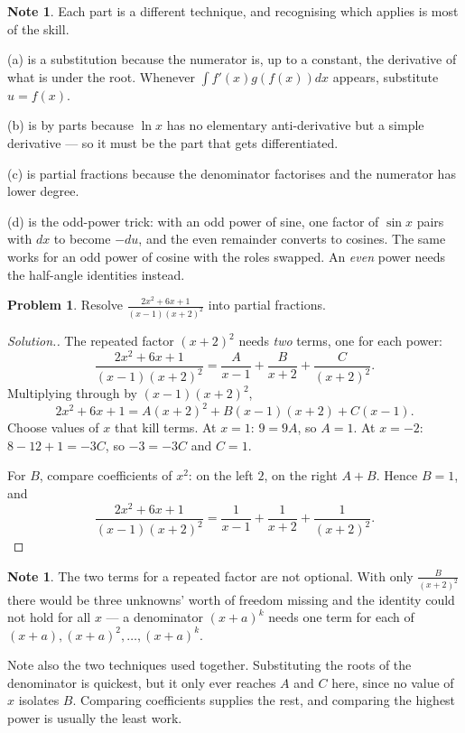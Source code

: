 \documentclass[11pt,a4paper]{article}
\theoremstyle{definition}
\newtheorem{note}[thm]{Note}
\newtheorem{problemx}{Problem}[section]
\newenvironment{problem}{\begin{problemx}}{\end{problemx}}
\newenvironment{solution}
  {\renewcommand{\qedsymbol}{}\begin{proof}[\textit{Solution}.]}
  {\end{proof}}
\begin{document}
\begin{note}
Each part is a different technique, and recognising which applies is most of the
skill.

(a) is a substitution because the numerator is, up to a constant, the derivative of
what is under the root. Whenever $\int f'(x)g\left(f(x)\right)dx$ appears, substitute
$u=f(x)$.

(b) is by parts because $\ln x$ has no elementary anti-derivative but a simple
derivative --- so it must be the part that gets differentiated.

(c) is partial fractions because the denominator factorises and the numerator has
lower degree.

(d) is the odd-power trick: with an odd power of sine, one factor of $\sin x$ pairs
with $dx$ to become $-du$, and the even remainder converts to cosines. The same
works for an odd power of cosine with the roles swapped. An \emph{even} power needs
the half-angle identities instead.
\end{note}

\pagebreak

\begin{problem}
Resolve $\frac{2x^{2}+6x+1}{(x-1)(x+2)^{2}}$ into partial fractions.
\end{problem}

\begin{solution}
The repeated factor $(x+2)^{2}$ needs \emph{two} terms, one for each power:
$$\frac{2x^{2}+6x+1}{(x-1)(x+2)^{2}}
=\frac{A}{x-1}+\frac{B}{x+2}+\frac{C}{(x+2)^{2}} .$$
Multiplying through by $(x-1)(x+2)^{2}$,
$$2x^{2}+6x+1=A(x+2)^{2}+B(x-1)(x+2)+C(x-1).$$
Choose values of $x$ that kill terms. At $x=1$:
$9=9A$, so $A=1$. At $x=-2$: $8-12+1=-3C$, so $-3=-3C$ and $C=1$.

For $B$, compare coefficients of $x^{2}$: on the left $2$, on the right $A+B$.
Hence $B=1$, and
$$\frac{2x^{2}+6x+1}{(x-1)(x+2)^{2}}
=\frac{1}{x-1}+\frac{1}{x+2}+\frac{1}{(x+2)^{2}} .$$
\end{solution}

\begin{note}
The two terms for a repeated factor are not optional. With only
$\frac{B}{(x+2)^{2}}$ there would be three unknowns' worth of freedom missing and
the identity could not hold for all $x$ --- a denominator $(x+a)^{k}$ needs one term
for each of $(x+a),(x+a)^{2},\dots,(x+a)^{k}$.

Note also the two techniques used together. Substituting the roots of the
denominator is quickest, but it only ever reaches $A$ and $C$ here, since no value
of $x$ isolates $B$. Comparing coefficients supplies the rest, and comparing the
highest power is usually the least work.
\end{note}
\end{document}
